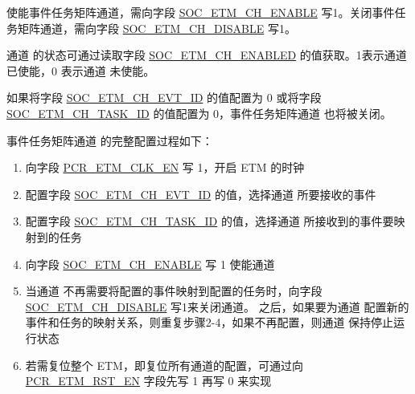 \documentclass[main\_\_CN.tex]{subfiles}
\begin{document}
使能事件任务矩阵通道，需向字段 \hyperref[fielddesc:SOCETMCHENABLE0]{SOC\_ETM\_CH\_ENABLE} 写1。关闭事件任务矩阵通道，需向字段 \hyperref[fielddesc:SOCETMCHDISABLE0]{SOC\_ETM\_CH\_DISABLE} 写1。

通道 的状态可通过读取字段 \hyperref[fielddesc:SOCETMCHENABLED0]{SOC\_ETM\_CH\_ENABLED} 的值获取。1表示通道 已使能，0 表示通道 未使能。

如果将字段 \hyperref[fielddesc:SOCETMCH0EVTID]{SOC\_ETM\_CH\_EVT\_ID} 的值配置为 0 或将字段 \hyperref[fielddesc:SOCETMCH0TASKID]{SOC\_ETM\_CH\_TASK\_ID} 的值配置为 0，事件任务矩阵通道 也将被关闭。

事件任务矩阵通道 的完整配置过程如下：
\begin{enumerate}
    \item 向字段 \hyperref[fielddesc:PCRETMCLKEN]{PCR\_ETM\_CLK\_EN} 写 1，开启 ETM 的时钟
    \item 配置字段 \hyperref[fielddesc:SOCETMCH0EVTID]{SOC\_ETM\_CH\_EVT\_ID} 的值，选择通道 所要接收的事件
    \item 配置字段 \hyperref[fielddesc:SOCETMCH0TASKID]{SOC\_ETM\_CH\_TASK\_ID} 的值，选择通道 所接收到的事件要映射到的任务
    \item 向字段 \hyperref[fielddesc:SOCETMCHENABLE0]{SOC\_ETM\_CH\_ENABLE} 写 1 使能通道
    \item 当通道 不再需要将配置的事件映射到配置的任务时，向字段 \hyperref[fielddesc:SOCETMCHDISABLE0]{SOC\_ETM\_CH\_DISABLE} 写1来关闭通道。 之后，如果要为通道 配置新的事件和任务的映射关系，则重复步骤2-4，如果不再配置，则通道 保持停止运行状态
    \item 若需复位整个 ETM，即复位所有通道的配置，可通过向 \hyperref[fielddesc:PCRETMRSTEN]{PCR\_ETM\_RST\_EN} 字段先写 1 再写 0 来实现
\end{enumerate}





\newpage
\hypertarget{evntaskmatrix-reg-summ}{}
\end{document}
